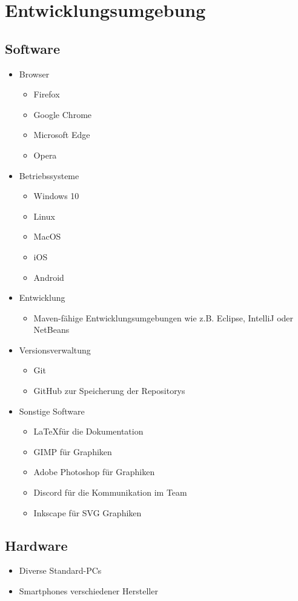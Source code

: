 \section{Entwicklungsumgebung}
\subsection{Software}
\begin{itemize}
    \item Browser
    \begin{itemize} [noitemsep]
        \item Firefox
        \item Google Chrome
        \item Microsoft Edge
        \item Opera
    \end{itemize} 
    \item Betriebssysteme
    \begin{itemize} [noitemsep]
        \item Windows 10
        \item Linux
        \item MacOS
        \item iOS
        \item Android
    \end{itemize}
    \item Entwicklung
    \begin{itemize} [noitemsep]
        \item \gls{Maven}-fähige Entwicklungsumgebungen wie z.B. \gls{Eclipse}, \gls{IntelliJ} oder \gls{NetBeans}
    \end{itemize}
    \item Versionsverwaltung
    \begin{itemize} [noitemsep]
        \item \gls{Git}
        \item \gls{GitHub} zur Speicherung der \glspl{Repository}
    \end{itemize}
    \item Sonstige Software
    \begin{itemize} [noitemsep]
        \item \LaTeX für die Dokumentation
        \item GIMP für Graphiken
        \item Adobe Photoshop für Graphiken
        \item Discord für die Kommunikation im Team
        \item Inkscape für SVG Graphiken
    \end{itemize}
\end{itemize}
\subsection{Hardware}
\begin{itemize} [noitemsep]
    \item Diverse \glspl{Standard-PC}
    \item \glspl{Smartphone} verschiedener Hersteller
\end{itemize}
